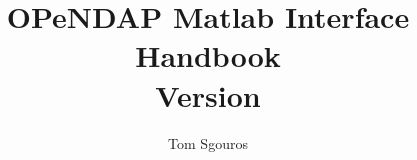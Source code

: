\documentclass{dods-book2}
\newcommand{\DOCversion}{Version \rcsInfoRevision}
\begin{document}
\title{OPeNDAP Matlab Interface Handbook\\\DOCversion}  
\author{Tom Sgouros}
\maketitle

\W{}



\tableofcontents
\listoffigures
\listoftables

\clearemptydoublepage








\appendix



%

%

%
%

\printindex
\end{document}
